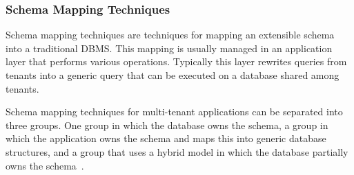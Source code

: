 \subsubsection{Schema Mapping Techniques}
Schema mapping techniques are techniques for mapping an extensible schema into a traditional \ac{DBMS}.
This mapping is usually managed in an application layer that performs various operations. 
Typically this layer rewrites queries from tenants into a generic query that can be executed on a database shared among tenants.

Schema mapping techniques for multi-tenant applications can be separated into three groups. 
One group in which the database owns the schema, a group in which the application owns the schema and maps this into generic database structures, and a group that uses a hybrid model in which the database partially owns the schema~\cite{aulbach2009comparison}.

